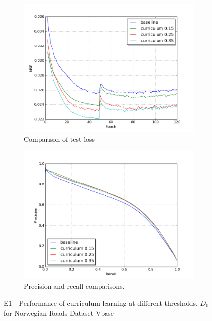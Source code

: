 \begin{figure}[!ht]
\begin{subfigure}{0.48\textwidth}
\includegraphics[width=\linewidth]{figs/E1/E1-lc-test.png}
\caption{Comparison of test loss} \label{fig:E1_curr_norway_loss}
\end{subfigure}
\hspace*{\fill} %
\begin{subfigure}{0.48\textwidth}
\includegraphics[width=\linewidth]{figs/E1/E1-pr-test.png}
\caption{Precision and recall comparisons.} \label{fig:E1_curr_norway_pr}
\end{subfigure}
\hspace*{\fill} %
\caption{E1 - Performance of curriculum learning at different thresholds, $D_{0}$ for Norwegian Roads Dataset Vbase} \label{fig:E1_curriculum_norway}
\end{figure}

